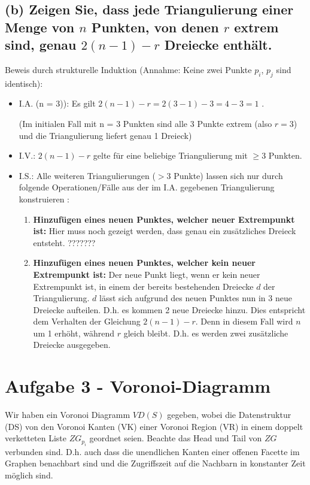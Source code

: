 \documentclass[a4paper]{article}
\begin{document}
\subsection*{(b) Zeigen Sie, dass jede Triangulierung einer Menge von $n$ Punkten, von denen $r$ extrem sind, genau $2 (n - 1) - r$ Dreiecke enthält.}

Beweis durch strukturelle Induktion (Annahme: Keine zwei Punkte $p_i$, $p_j$ sind identisch):

\begin{itemize}
	\item I.A. (n = 3)): Es gilt $2 (n - 1) - r = 2 (3 - 1) - 3 = 4 - 3 = 1$ . \checkmark
	
	(Im initialen Fall mit  n = 3 Punkten sind alle 3 Punkte extrem (also $r = 3$) und die Triangulierung liefert genau 1 Dreieck) 
	\item I.V.: $2 (n - 1) - r$ gelte für eine beliebige Triangulierung mit $\geq 3$ Punkten.
	\item I.S.: Alle weiteren Triangulierungen ($> 3$ Punkte) lassen sich nur durch folgende Operationen/Fälle aus der im I.A. gegebenen Triangulierung konstruieren :
	\begin{enumerate}
		\item \textbf{Hinzufügen eines neuen Punktes, welcher neuer Extrempunkt ist:}
			Hier muss noch gezeigt werden, dass genau ein zusätzliches Dreieck entsteht.
			???????
		\item \textbf{Hinzufügen eines neuen Punktes, welcher kein neuer Extrempunkt ist:}
			Der neue Punkt liegt, wenn er kein neuer Extrempunkt ist, in einem der 
			bereits bestehenden Dreiecke $d$ der Triangulierung. $d$ lässt sich aufgrund
			des neuen Punktes nun in 3 neue Dreiecke aufteilen. D.h. es kommen 2 neue Dreiecke hinzu. Dies entspricht dem Verhalten 	der Gleichung $2 (n - 1) - r$. Denn in diesem Fall wird $n$ um 1 erhöht, während $r$ gleich bleibt. D.h. es werden zwei zusätzliche Dreiecke ausgegeben. \checkmark
	\end{enumerate}
\end{itemize}


\section*{Aufgabe 3 - Voronoi-Diagramm}


Wir haben ein Voronoi Diagramm $VD(S)$ gegeben, wobei die Datenstruktur (DS) von den Voronoi Kanten (VK) einer Voronoi Region (VR) in einem doppelt verketteten Liste $ZG_{p_i}$ geordnet seien. Beachte das Head und Tail von $ZG$ verbunden sind. D.h. auch dass die unendlichen Kanten einer offenen Facette im Graphen benachbart sind und die Zugriffszeit auf die Nachbarn in konstanter Zeit möglich sind.
\end{document}
